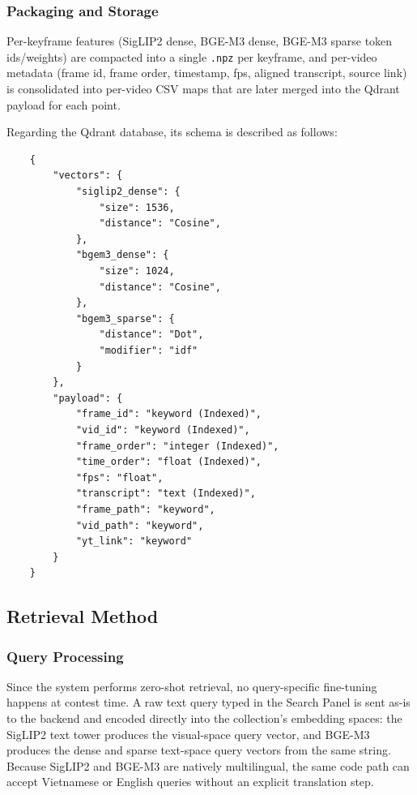 \documentclass[11pt,a4paper]{article}
\begin{document}
\subsubsection{Packaging and Storage}
Per-keyframe features (SigLIP2 dense, BGE-M3 dense, BGE-M3 sparse token ids/weights) are compacted into a single \texttt{.npz} per keyframe, and per-video metadata (frame id, frame order, timestamp, fps, aligned transcript, source link) is consolidated into per-video CSV maps that are later merged into the Qdrant payload for each point.

Regarding the Qdrant database, its schema is described as follows:

\begin{lstlisting}
    {
        "vectors": {
            "siglip2_dense": {
                "size": 1536,
                "distance": "Cosine",
            },
            "bgem3_dense": {
                "size": 1024,
                "distance": "Cosine",
            },
            "bgem3_sparse": {
                "distance": "Dot",
                "modifier": "idf"
            }
        },
        "payload": {
            "frame_id": "keyword (Indexed)",
            "vid_id": "keyword (Indexed)",
            "frame_order": "integer (Indexed)",
            "time_order": "float (Indexed)",
            "fps": "float",
            "transcript": "text (Indexed)",
            "frame_path": "keyword",
            "vid_path": "keyword",
            "yt_link": "keyword"
        }
    }
\end{lstlisting}

\subsection{Retrieval Method}

\subsubsection{Query Processing}

Since the system performs zero-shot retrieval, no query-specific fine-tuning happens at contest time. A raw text query typed in the Search Panel is sent as-is to the backend and encoded directly into the collection's embedding spaces: the SigLIP2 text tower produces the visual-space query vector, and BGE-M3 produces the dense and sparse text-space query vectors from the same string. Because SigLIP2 and BGE-M3 are natively multilingual, the same code path can accept Vietnamese or English queries without an explicit translation step.
\end{document}

